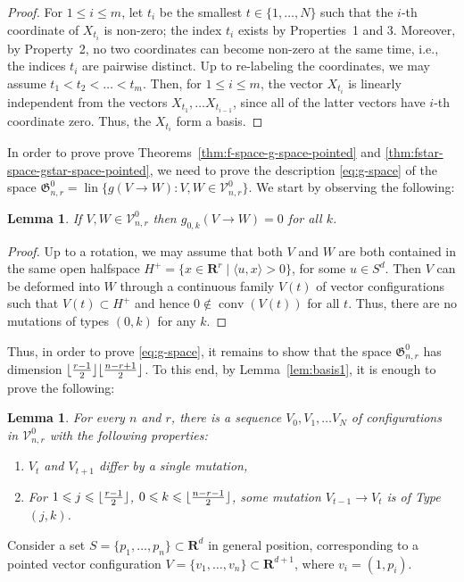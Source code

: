 \documentclass[11pt]{article}
\newtheorem{lemma}[theorem]{Lemma}
\DeclareMathOperator{\conv}{conv}
\DeclareMathOperator{\lin}{lin}
\newcommand{\gspace}{\mathfrak{G}}
\renewcommand{\leq}{\leqslant}
\newcommand{\R}{\mathbf{R}}
\DeclarePairedDelimiter\floor{\lfloor}{\rfloor}
\begin{document}
%
\begin{proof}
For $1 \leq i\leq m$, let $t_i$ be the smallest $t\in \{1,\dots,N\}$ such that the $i$-th coordinate of $X_{t_i}$ is non-zero; the index $t_i$ exists by Properties~1 and 3. Moreover, by Property~2, no two coordinates can become non-zero at the same time, i.e., the indices $t_i$ are pairwise distinct. Up to re-labeling the coordinates, we may assume $t_1 < t_2 < \ldots < t_m$. Then, for $1\leq i \leq m$, the vector $X_{t_i}$ is linearly independent from the vectors $X_{t_1},\dots X_{t_{i-1}}$, since all of the latter vectors have $i$-th coordinate zero. Thus, the $X_{t_i}$ form a basis.
\end{proof}
%
In order to prove prove Theorems~\ref{thm:f-space-g-space-pointed} and \ref{thm:fstar-space-gstar-space-pointed}, we need to prove the description \eqref{eq:g-space} of the space $\gspace_{n,r}^0=\lin\{g(V\to W)\colon V,W \in \mathcal{V}^0_{n,r}\}$. We start by observing the following:
\begin{lemma}
If $V,W \in \mathcal{V}^0_{n,r}$ then $g_{0,k}(V \to W)=0$ for all $k$.
\end{lemma}
%
\begin{proof}
Up to a rotation, we may assume that both $V$ and $W$ are both contained in the same open halfspace $H^+ = \{ x \in \R^r \mid \langle u ,x \rangle > 0 \}$, for some $u \in S^d$. Then $V$ can be deformed into $W$ through a continuous family $V(t)$ of vector configurations such that $V(t) \subset H^+$ and hence $0 \notin \conv (V(t))$ for all $t$. Thus, there are no mutations of types $(0,k)$ for any $k$.
\end{proof}
%
%
Thus, in order to prove \eqref{eq:g-space}, it remains to show that the space $\gspace^0_{n,r}$ has dimension $\floor{\frac{r-1}{2}}\floor{\frac{n-r+1}{2}}$. 
To this end, by Lemma~\ref{lem:basis1}, it is enough to prove the following:
\begin{lemma}
\label{lem:all-mutations}
For every $n$ and $r$, there is a sequence $V_0, V_1, \ldots V_N$ of configurations in $\mathcal{V}^0_{n,r}$ with the following properties:
\begin{enumerate}
\item $V_t$ and $V_{t+1}$ differ by a single mutation,
\item For $1 \leq j \leq \floor{\frac{r-1}{2}}$, $0 \leq k \leq \floor{\frac{n-r-1}{2}}$, some mutation $V_{t-1} \to V_t$ is of Type $(j,k)$.
\end{enumerate}
\end{lemma}
%
Consider a set $S = \{p_1,\dots,p_n \}\subset \R^d$ in general position, corresponding to a pointed vector configuration $V = \{v_1,\dots,v_n\} \subset \R^{d+1}$, where $v_i=(1, p_i)$. 
\end{document}
